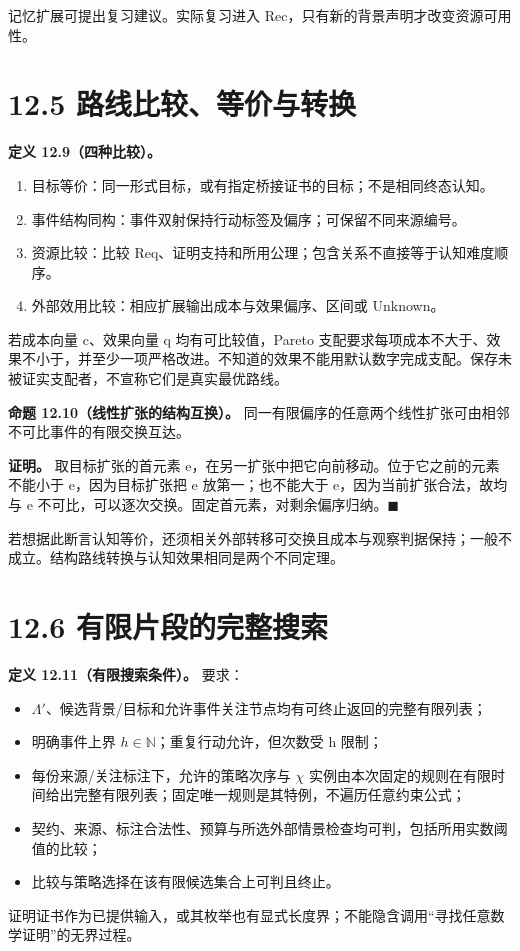 \documentclass[UTF8,a4paper,zihao=-4,fontset=windows,openany]{ctexbook}
\begin{document}
记忆扩展可提出复习建议。实际复习进入 Rec，只有新的背景声明才改变资源可用性。

\section{12.5 路线比较、等价与转换}
\textbf{定义 12.9（四种比较）。}

\begin{enumerate}
\item 目标等价：同一形式目标，或有指定桥接证书的目标；不是相同终态认知。
\item 事件结构同构：事件双射保持行动标签及偏序；可保留不同来源编号。
\item 资源比较：比较 Req、证明支持和所用公理；包含关系不直接等于认知难度顺序。
\item 外部效用比较：相应扩展输出成本与效果偏序、区间或 Unknown。
\end{enumerate}
若成本向量 c、效果向量 q 均有可比较值，Pareto 支配要求每项成本不大于、效果不小于，并至少一项严格改进。不知道的效果不能用默认数字完成支配。保存未被证实支配者，不宣称它们是真实最优路线。

\textbf{命题 12.10（线性扩张的结构互换）。} 同一有限偏序的任意两个线性扩张可由相邻不可比事件的有限交换互达。

\textbf{证明。} 取目标扩张的首元素 e，在另一扩张中把它向前移动。位于它之前的元素不能小于 e，因为目标扩张把 e 放第一；也不能大于 e，因为当前扩张合法，故均与 e 不可比，可以逐次交换。固定首元素，对剩余偏序归纳。\(\blacksquare\)

若想据此断言认知等价，还须相关外部转移可交换且成本与观察判据保持；一般不成立。结构路线转换与认知效果相同是两个不同定理。

\section{12.6 有限片段的完整搜索}
\textbf{定义 12.11（有限搜索条件）。} 要求：

\begin{itemize}
\item \(\Lambda'\)、候选背景/目标和允许事件关注节点均有可终止返回的完整有限列表；
\item 明确事件上界 \(h\in\mathbb{N}\)；重复行动允许，但次数受 h 限制；
\item 每份来源/关注标注下，允许的策略次序与 \(\chi\) 实例由本次固定的规则在有限时间给出完整有限列表；固定唯一规则是其特例，不遍历任意约束公式；
\item 契约、来源、标注合法性、预算与所选外部情景检查均可判，包括所用实数阈值的比较；
\item 比较与策略选择在该有限候选集合上可判且终止。
\end{itemize}
证明证书作为已提供输入，或其枚举也有显式长度界；不能隐含调用“寻找任意数学证明”的无界过程。
\end{document}
